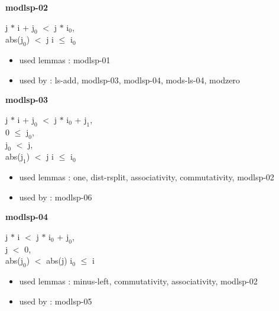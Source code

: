 \documentclass[a4paper]{article}
\begin{document}
{\large\bf modlsp-02}

\medskip

j $*$ i + $\mbox{j}_{0}$ $<$ j $*$ $\mbox{i}_{0}$, \\
abs($\mbox{j}_{0}$) $<$ j \Fol i $\le$ $\mbox{i}_{0}$

\begin{itemize}


\item       used lemmas  : modlsp-01
\item       used by      : ls-add, modlsp-03, modlsp-04, mods-ls-04, modzero

\end{itemize}

\medskip

\bigskip

{\large\bf modlsp-03}

\medskip

j $*$ i + $\mbox{j}_{0}$ $<$ j $*$ $\mbox{i}_{0}$ + $\mbox{j}_{1}$, \\
0 $\le$ $\mbox{j}_{0}$, \\
$\mbox{j}_{0}$ $<$ j, \\
abs($\mbox{j}_{1}$) $<$ j \Fol i $\le$ $\mbox{i}_{0}$

\begin{itemize}


\item       used lemmas  : one, dist-rsplit, associativity, commutativity, modlsp-02
\item       used by      : modlsp-06

\end{itemize}

\medskip

\bigskip

{\large\bf modlsp-04}

\medskip

j $*$ i $<$ j $*$ $\mbox{i}_{0}$ + $\mbox{j}_{0}$, \\
j $<$ 0, \\
abs($\mbox{j}_{0}$) $<$ abs(j) \Fol $\mbox{i}_{0}$ $\le$ i

\begin{itemize}


\item       used lemmas  : minus-left, commutativity, associativity, modlsp-02
\item       used by      : modlsp-05

\end{itemize}
\end{document}
